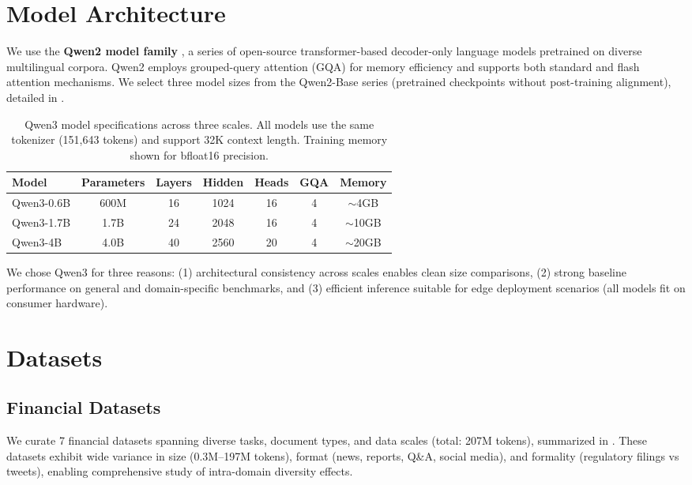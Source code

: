\section{Model Architecture}

We use the \textbf{Qwen2 model family} \parencite{yang2024qwen2}, a series of open-source transformer-based decoder-only language models pretrained on diverse multilingual corpora. Qwen2 employs grouped-query attention (GQA) for memory efficiency and supports both standard and flash attention mechanisms. We select three model sizes from the Qwen2-Base series (pretrained checkpoints without post-training alignment), detailed in .

\begin{table}[h]
\centering
\caption[Qwen3 Model Specifications]{Qwen3 model specifications across three scales. All models use the same tokenizer (151,643 tokens) and support 32K context length. Training memory shown for bfloat16 precision.}
\label{tab:model_specs}
\begin{tabular}{lcccccc}
\toprule
\textbf{Model} & \textbf{Parameters} & \textbf{Layers} & \textbf{Hidden} & \textbf{Heads} & \textbf{GQA} & \textbf{Memory} \\
\midrule
Qwen3-0.6B & 600M & 16 & 1024 & 16 & 4 & $\sim$4GB \\
Qwen3-1.7B & 1.7B & 24 & 2048 & 16 & 4 & $\sim$10GB \\
Qwen3-4B & 4.0B & 40 & 2560 & 20 & 4 & $\sim$20GB \\
\bottomrule
\end{tabular}
\end{table}

We chose Qwen3 for three reasons: (1) architectural consistency across scales enables clean size comparisons, (2) strong baseline performance on general and domain-specific benchmarks, and (3) efficient inference suitable for edge deployment scenarios (all models fit on consumer hardware).

\section{Datasets}

\subsection{Financial Datasets}

We curate 7 financial datasets spanning diverse tasks, document types, and data scales (total: 207M tokens), summarized in . These datasets exhibit wide variance in size (0.3M--197M tokens), format (news, reports, Q\&A, social media), and formality (regulatory filings vs tweets), enabling comprehensive study of intra-domain diversity effects.

